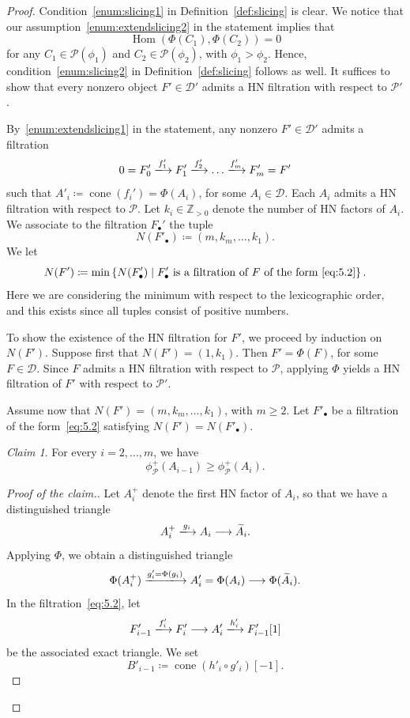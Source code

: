 \documentclass[11pt, reqno]{amsart}
\numberwithin{equation}{section}
\theoremstyle{plain}
\theoremstyle{remark}
\newtheorem*{claim*}{Claim}
\theoremstyle{definition}
\theoremstyle{italicsname}
\newcommand{\st}{\mid}
\DeclareMathOperator{\Hom}{Hom}
\DeclareMathOperator{\cone}{cone}
\newcommand{\cD}{\mathscr{D}}
\newcommand{\cP}{\mathscr{P}}
\def\ZZ{\ensuremath{\mathbb{Z}}}
\begin{document}
\begin{proof}
Condition~\ref{enum:slicing1} in Definition~\ref{def:slicing} is clear.
We notice that our assumption~\ref{enum:extendslicing2} in the statement implies that
\[
\Hom(\Phi(C_1),\Phi(C_2))=0
\]
for any $C_1\in\cP(\phi_1)$ and $C_2\in\cP(\phi_2)$, with $\phi_1>\phi_2$. 
Hence, condition~\ref{enum:slicing2} in Definition~\ref{def:slicing} follows as well.
It suffices to show that every nonzero object $F'\in\cD'$ admits a HN filtration with respect to $\cP'$.

By~\ref{enum:extendslicing1} in the statement, any nonzero $F'\in\cD'$ admits a filtration
\begin{equation}\label{eq:5.2}
0=F'_0\xlongrightarrow{f'_1}F'_1\xlongrightarrow{f'_2}\dots\xlongrightarrow{f'_m}F'_m=F'
\end{equation}
such that $A'_i\coloneqq\cone(f_i')=\Phi(A_i)$, for some $A_i\in\cD$.
Each $A_i$ admits a HN filtration with respect to $\cP$. 
Let $k_i\in\ZZ_{>0}$ denote the number of HN factors of $A_i$. 
We associate to the filtration $F_\bullet'$ the tuple
\[
N(F'_\bullet)\coloneqq (m,k_m,\dots,k_1).
\]
We let
\[
N(F')\coloneqq\min\left\{N(F'_\bullet)\st F'_\bullet \text{ is a filtration of $F$ of the form \eqref{eq:5.2}}\right\}.
\]
Here we are considering the minimum with respect to the lexicographic order, and this exists since all tuples consist of positive numbers.

To show the existence of the HN filtration for $F'$, we proceed by induction on $N(F')$.
Suppose first that $N(F')=(1,k_1)$.
Then $F'=\Phi(F)$, for some $F\in\cD$. 
Since $F$ admits a HN filtration with respect to $\cP$, applying $\Phi$ yields a HN filtration of $F'$ with respect to $\cP'$.

Assume now that $N(F')=(m,k_m,\dots,k_1)$, with $m\ge 2$.
Let $F'_\bullet$ be a filtration of the form~\eqref{eq:5.2} satisfying $N(F')=N(F'_\bullet)$.

\begin{claim*}
For every $i=2,\dots,m$, we have
\begin{equation}\label{eq:5.3}
\phi^+_\cP(A_{i-1})\geq\phi^+_\cP(A_i).
\end{equation}
\end{claim*}

\begin{proof}[Proof of the claim.]
Let $A_i^+$ denote the first HN factor of $A_i$, so that we have a distinguished triangle
\[
A_i^+\xlongrightarrow{g_i} A_i\longrightarrow \widetilde{A}_i.
\]
Applying $\Phi$, we obtain a distinguished triangle
\[
\Phi(A_i^+)\xlongrightarrow{g'_i=\Phi(g_i)} A'_i=\Phi(A_i)\longrightarrow \Phi(\widetilde{A}_i).
\]
In the filtration~\eqref{eq:5.2}, let
\[
F_{i-1}'\xlongrightarrow{f_i'}F_i'\longrightarrow A_i'\xlongrightarrow{h'_i} F'_{i-1}[1]
\]
be the associated exact triangle. 
We set
\[
B'_{i-1}\coloneqq\cone(h'_i\circ g'_i)[-1].
\]


\end{proof}
\end{proof}
\end{document}
